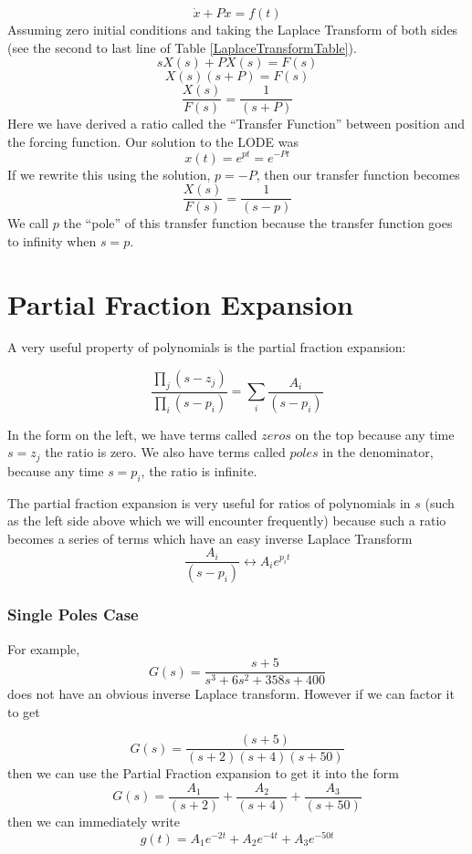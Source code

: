 \[
\dot{x} + Px = f(t)
\]
Assuming zero initial conditions and taking the Laplace Transform of both sides (see the second to last line of Table \ref{LaplaceTransformTable}).
\[
sX(s) + PX(s) = F(s)
\]
\[
X(s) (s+P) = F(s)
\]
\[
\frac{X(s)}{F(s)} = \frac {1}  {(s+P)}
\]
Here we have derived a ratio called the ``Transfer Function'' between position and the forcing function.  Our solution to the LODE was
\[
x(t) =  e^{pt} =  e^{-Pt}
\]
If we rewrite this using the solution, $p = -P$, then our transfer function becomes
\[
\frac{X(s)}{F(s)} = \frac {1}  {(s-p)}
\]
We call $p$ the ``pole'' of this transfer function because the transfer function goes to infinity when $s=p$.



\section{Partial Fraction Expansion}\label{partialfractionsection}

A very useful property of polynomials is the partial fraction expansion:

\[
\frac{\prod_j (s-z_j)}{\prod_i (s-p_i)}    =  \sum_i  \frac{A_i}{(s-p_i)}
\]

In the form on the left, we have terms called $zeros$ on the top because any time $s=z_j$ the ratio is zero.  We also have terms called $poles$ in the denominator, because any time $s=p_i$, the ratio is infinite.

The partial fraction expansion is very useful for ratios of polynomials in $s$
(such as the left side above which we will encounter frequently) because such a ratio
becomes a series of terms which have an easy inverse Laplace Transform
\[
\frac{A_i}{(s-p_i)}   \leftrightarrow  A_ie^{p_it}
\]



\subsubsection{Single Poles Case}
For example,
\[
G(s) = \frac{s+5}{s^3 + 6s^2+ 358s+400}
\]
does not have an obvious inverse Laplace transform.   However if we can factor it to get

\[
G(s) = \frac  {(s+5)}   {(s+2)(s+4)(s+50)}
\]
then we can use the Partial Fraction expansion to  get it into the form
\[
G(s) = \frac{A_1}{(s+2)}+\frac{A_2}{(s+4)}+\frac{A_3}{(s+50)}
\]
then we can immediately write
\[
g(t) = A_1e^{-2t} + A_2e^{-4t} + A_3e^{-50t}
\]





